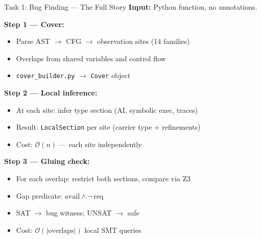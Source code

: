 \documentclass[aspectratio=169,10pt]{beamer}
\begin{document}
\begin{frame}{Task 1: Bug Finding — The Full Story}
\textbf{Input:} Python function, no annotations.

\textbf{Step 1 --- Cover:}
\begin{itemize}
  \item Parse AST $\to$ CFG $\to$ observation sites (14 families)
  \item Overlaps from shared variables and control flow
  \item \texttt{cover\_builder.py} $\to$ \texttt{Cover} object
\end{itemize}

\textbf{Step 2 --- Local inference:}
\begin{itemize}
  \item At each site: infer type section (AI, symbolic exec, traces)
  \item Result: \texttt{LocalSection} per site (carrier type + refinements)
  \item Cost: $\mathcal{O}(n)$ --- each site independently
\end{itemize}

\textbf{Step 3 --- Gluing check:}
\begin{itemize}
  \item For each overlap: restrict both sections, compare via Z3
  \item Gap predicate: $\text{avail} \wedge \lnot\,\text{req}$
  \item SAT $\to$ bug witness; UNSAT $\to$ safe
  \item Cost: $\mathcal{O}(|\text{overlaps}|)$ local SMT queries
\end{itemize}
\end{frame}
\end{document}
